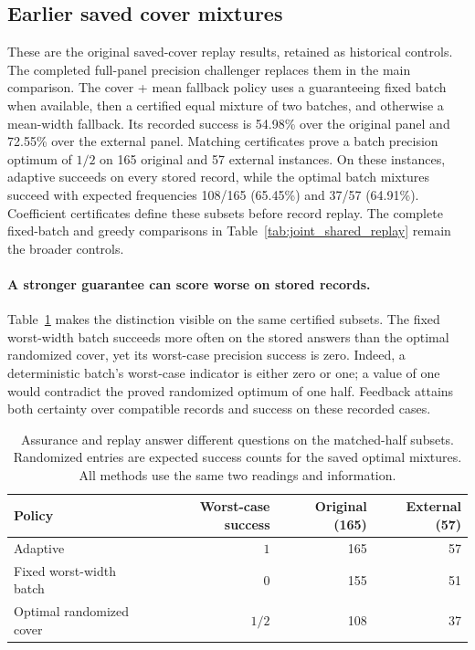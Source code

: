 \subsection{Earlier saved cover mixtures}
These are the original saved-cover replay results, retained as historical controls. The completed full-panel precision challenger replaces them in the main comparison.
The cover + mean fallback policy uses a guaranteeing fixed batch when
available, then a certified equal mixture of two batches, and otherwise a
mean-width fallback.
Its recorded success is 54.98\% over the original panel and 72.55\% over the
external panel.
Matching certificates prove a batch precision optimum of
$1/2$ on 165 original and 57 external instances. On these instances, adaptive
succeeds on every stored record, while the optimal batch mixtures succeed
with expected frequencies 108/165 (65.45\%) and 37/57 (64.91\%). Coefficient
certificates define these subsets before record replay. The complete fixed-batch and greedy
comparisons in Table~\ref{tab:joint_shared_replay} remain the broader controls.

\paragraph{A stronger guarantee can score worse on stored records.}
Table~\ref{tab:guarantee-recorded-tradeoff} makes the distinction visible on
the same certified subsets. The fixed worst-width batch succeeds more often
on the stored answers than the optimal randomized cover, yet its worst-case
precision success is zero. Indeed, a deterministic batch's worst-case
indicator is either zero or one; a value of one would contradict the
proved randomized optimum of one half. Feedback attains both certainty
over compatible records and success on these recorded cases.

\begin{table}[htbp]\centering\small
\caption{Assurance and replay answer different questions on the matched-half
subsets. Randomized entries are expected success counts for the saved
optimal mixtures. All methods use the same two readings and information.}
\label{tab:guarantee-recorded-tradeoff}
\begin{tabular}{lrrr}\toprule
Policy & Worst-case success & Original (165) & External (57)\\\midrule
Adaptive & $1$ & 165 & 57\\
Fixed worst-width batch & $0$ & 155 & 51\\
Optimal randomized cover & $1/2$ & 108 & 37\\
\bottomrule\end{tabular}\end{table}

